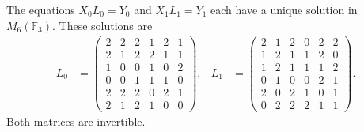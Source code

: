 \begin{theorem}
\label{act21:thm:df-elevaciones-reconstruidas}
The equations \(X_0L_0=Y_0\) and \(X_1L_1=Y_1\) each have a unique
solution in \(M_6(\mathbb F_3)\). These solutions are
\begin{align*}
 L_0&=\begin{pmatrix}
2&2&2&1&2&1\\2&1&2&2&1&1\\1&0&0&1&0&2\\
0&0&1&1&1&0\\2&2&2&0&2&1\\2&1&2&1&0&0
\end{pmatrix},&
 L_1&=\begin{pmatrix}
2&1&2&0&2&2\\1&2&1&1&2&0\\1&2&1&1&1&2\\
0&1&0&0&2&1\\2&0&2&1&0&1\\0&2&2&2&1&1
\end{pmatrix}.
\end{align*}
Both matrices are invertible.
\end{theorem}

